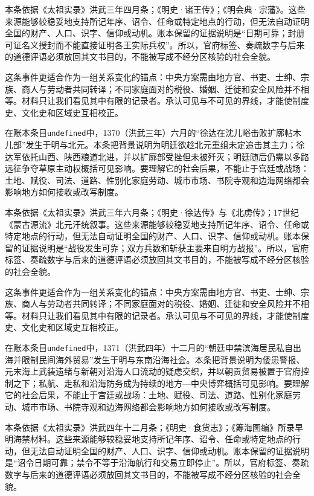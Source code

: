 本条依据《太祖实录》洪武三年四月条；《明史·诸王传》；《明会典·宗藩》。这些来源能够较稳妥地支持所记年序、诏令、任命或特定地点的行动，但无法自动证明全国的财产、人口、识字、信仰或动机。账本保留的证据说明是“日期可靠；封册可证名义授封而不能直接证明各王实际兵权”。所以，官府标签、奏疏数字与后来的道德评语必须放回其文书目的，不能被写成不经分区核验的社会全貌。

这条事件更适合作为一组关系变化的锚点：中央方案需由地方官、书吏、士绅、宗族、商人与劳动者共同转译；不同家庭面对的税役、婚姻、迁徙和安全风险并不相等。材料只让我们看见其中有限的记录者。承认可见与不可见的界线，才能使制度史、文化史和区域史互相校正。

在账本条目\texttt{undefined}中，1370（洪武三年）六月的“徐达在沈儿峪击败扩廓帖木儿部”发生于明与北元。本条把背景说明为明廷欲趁北元重组未定追击其主力；徐达军依托山西、陕西粮道北进，并以扩廓部受挫但未被歼灭；明廷随后仍需以多路远征争夺草原主动权概括可见影响。要理解它的社会后果，不能止于宫廷或战场：土地、赋役、司法、道路、性别化家庭劳动、城市市场、书院寺观和边海网络都会影响地方如何接收或改写制度。

本条依据《太祖实录》洪武三年六月条；《明史·徐达传》与《北虏传》；17世纪《蒙古源流》北元汗统叙事。这些来源能够较稳妥地支持所记年序、诏令、任命或特定地点的行动，但无法自动证明全国的财产、人口、识字、信仰或动机。账本保留的证据说明是“战役发生可靠；双方兵数和斩获主要来自明方战报”。所以，官府标签、奏疏数字与后来的道德评语必须放回其文书目的，不能被写成不经分区核验的社会全貌。

这条事件更适合作为一组关系变化的锚点：中央方案需由地方官、书吏、士绅、宗族、商人与劳动者共同转译；不同家庭面对的税役、婚姻、迁徙和安全风险并不相等。材料只让我们看见其中有限的记录者。承认可见与不可见的界线，才能使制度史、文化史和区域史互相校正。

在账本条目\texttt{undefined}中，1371（洪武四年）十二月的“朝廷申禁滨海居民私自出海并限制民间海外贸易”发生于明与东南沿海社会。本条把背景说明为倭患警报、元末海上武装遗绪与新朝对沿海人口流动的疑虑交织，并以朝贡贸易被置于官府控制之下；私航、走私和沿海防务成为持续的地方—中央博弈概括可见影响。要理解它的社会后果，不能止于宫廷或战场：土地、赋役、司法、道路、性别化家庭劳动、城市市场、书院寺观和边海网络都会影响地方如何接收或改写制度。

本条依据《太祖实录》洪武四年十二月条；《明史·食货志》；《筹海图编》所录早明海禁材料。这些来源能够较稳妥地支持所记年序、诏令、任命或特定地点的行动，但无法自动证明全国的财产、人口、识字、信仰或动机。账本保留的证据说明是“诏令日期可靠；禁令不等于沿海航行和交易立即停止”。所以，官府标签、奏疏数字与后来的道德评语必须放回其文书目的，不能被写成不经分区核验的社会全貌。

